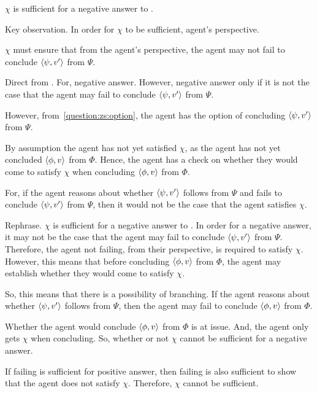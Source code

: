 \begin{note}
  \(\chi\) is sufficient for a negative answer to \qzS{}.

  Key observation.
  In order for \(\chi\) to be sufficient, agent's perspective.

  \begin{proposition}
    \label{prop:chiProp:no-may-fail}
    \(\chi\) must ensure that from the agent's perspective, the agent may not fail to conclude \(\langle \psi, v' \rangle\) from \(\Psi\).
    \begin{argument}
      Direct from \qzS{}.
      For, negative answer.
      However, negative answer only if it is not the case that the agent may fail to conclude \(\langle \psi, v' \rangle\) from \(\Psi\).
    \end{argument}
  \end{proposition}

  However, from~\ref{question:zs:option}, the agent has the option of concluding \(\langle \psi, v' \rangle\) from \(\Psi\).

  By assumption the agent has not yet satisfied \(\chi\), as the agent has not yet concluded \(\langle \phi, v \rangle\) from \(\Phi\).
  Hence, the agent has a check on whether they would come to satisfy \(\chi\) when concluding \(\langle \phi, v \rangle\) from \(\Phi\).

  For, if the agent reasons about whether \(\langle \psi, v' \rangle\) follows from \(\Psi\) and fails to conclude \(\langle \psi, v' \rangle\) from \(\Psi\), then it would not be the case that the agent satisfies \(\chi\).

  Rephrase.
  \(\chi\) is sufficient for a negative answer to \qzS{}.
  In order for a negative answer, it may not be the case that the agent may fail to conclude \(\langle \psi, v' \rangle\) from \(\Psi\).
  Therefore, the agent not failing, from their perspective, is required to satisfy \(\chi\).
  However, this means that before concluding \(\langle \phi, v \rangle\) from \(\Phi\), the agent may establish whether they would come to satisfy \(\chi\).

  So, this means that there is a possibility of branching.
  If the agent reasons about whether \(\langle \psi, v' \rangle\) follows from \(\Psi\), then the agent may fail to conclude \(\langle \phi, v \rangle\) from \(\Phi\).

  Whether the agent would conclude \(\langle \phi, v \rangle\) from \(\Phi\) is at issue.
  And, the agent only gets \(\chi\) when concluding.
  So, whether or not \(\chi\) cannot be sufficient for a negative answer.

  If failing is sufficient for positive answer, then failing is also sufficient to show that the agent does not satisfy \(\chi\).
  Therefore, \(\chi\) cannot be sufficient.
\end{note}

